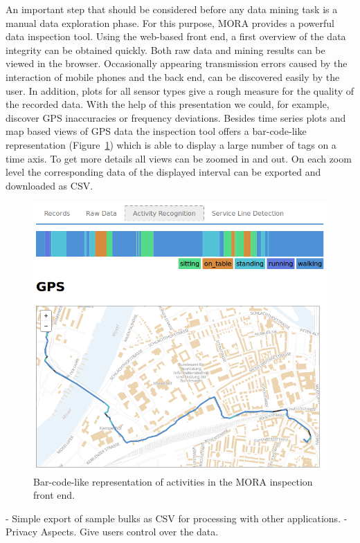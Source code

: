 \documentclass[times, 10pt,twocolumn]{article}
\begin{document}
An important step that should be considered before any data mining task is a manual data exploration phase. For this purpose, MORA provides a powerful data inspection tool. Using the web-based front end, a first overview of the data integrity can be obtained quickly. Both raw data and mining results can be viewed in the browser. Occasionally appearing transmission errors caused by the interaction of mobile phones and the back end, can be discovered easily by the user. In addition, plots for all sensor types give a rough measure for the quality of the recorded data. With the help of this presentation we could, for example, discover GPS inaccuracies or frequency deviations.
Besides time series plots and map based views of GPS data the inspection tool offers a bar-code-like representation (Figure~\ref{fig:inspectionBarcode}) which is able to display a large number of tags on a time axis.
To get more details all views can be zoomed in and out. On each zoom level the corresponding data of the displayed interval can be exported and downloaded as CSV.
\begin{figure}[h]
\includegraphics[width=\linewidth]{img/BarcodeScreenshot.png}
\caption{Bar-code-like representation of activities in the MORA inspection front end.}
\label{fig:inspectionBarcode}
\end{figure}


  - Simple export of sample bulks as CSV for processing with other applications.
  - Privacy Aspects. Give users control over the data.
\end{document}
